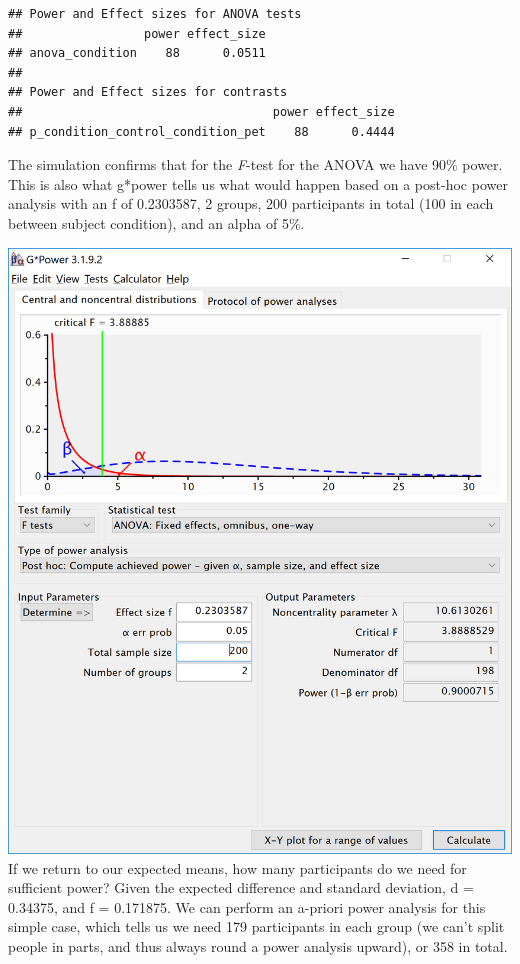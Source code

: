 \documentclass[]{book}
\begin{document}
\begin{verbatim}
## Power and Effect sizes for ANOVA tests
##                 power effect_size
## anova_condition    88      0.0511
## 
## Power and Effect sizes for contrasts
##                                   power effect_size
## p_condition_control_condition_pet    88      0.4444
\end{verbatim}

The simulation confirms that for the \emph{F}-test for the ANOVA we have 90\% power. This is also what g*power tells us what would happen based on a post-hoc power analysis with an f of 0.2303587, 2 groups, 200 participants in total (100 in each between subject condition), and an alpha of 5\%.

\includegraphics{screenshots/gpower_8.png}
If we return to our expected means, how many participants do we need for sufficient power? Given the expected difference and standard deviation, d = 0.34375, and f = 0.171875. We can perform an a-priori power analysis for this simple case, which tells us we need 179 participants in each group (we can't split people in parts, and thus always round a power analysis upward), or 358 in total.
\end{document}
